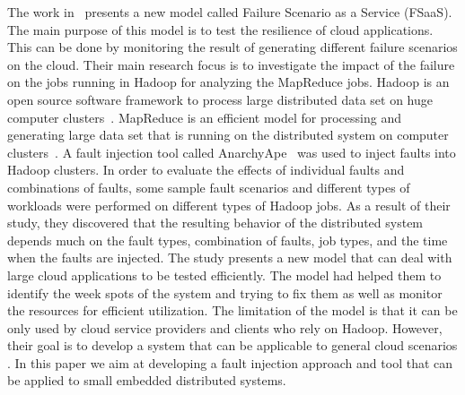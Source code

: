 The work in~\cite{FaaS} presents a new model called Failure Scenario as a Service (FSaaS). The main purpose of this model is to test the resilience of cloud applications. This can be done by monitoring the result of generating different failure scenarios on the cloud. Their main research focus is to investigate the impact of the failure on the jobs running in Hadoop for analyzing the MapReduce jobs. Hadoop is an open source software framework %
to process large distributed data set on huge computer clusters~\cite{hadoop}. MapReduce is an efficient model for processing and generating large data set that is running on the distributed system on computer clusters~\cite{mapreduce}.    
A fault injection tool called AnarchyApe~\cite{AnarchyApe} was used to inject faults into Hadoop clusters. In order to evaluate the effects of individual faults and combinations of faults, some sample fault scenarios and different types of workloads were performed on different types of Hadoop jobs. As a result of their study, they discovered that the resulting behavior of the distributed system depends much on the fault types, combination of faults, job types, and the time when the faults are injected. %
The study presents a new model that can deal with large cloud applications to be tested efficiently. 
The model had helped them to identify the week spots of the system and trying to fix them as well as monitor the resources for efficient utilization.
The limitation of the model is that it can be only used by cloud service providers and clients who rely on Hadoop. However, their goal is to develop a system that can be applicable to general cloud scenarios \cite{FaaS}. In this paper we aim at developing a fault injection approach and tool that can be applied to small embedded distributed systems. %
 

